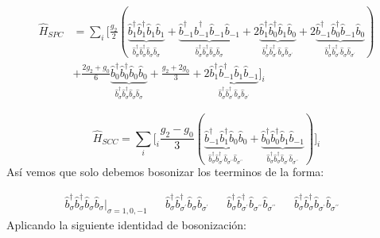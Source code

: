 \begin{align}
\hat{H}_{SPC} &= \sum_i \Bigg[ \frac{g_2}{2}\left(\underbrace{\hat{b}_{1}^{\dagger}\hat{b}_{1}^{\dagger} \hat{b}_{1}^{} \hat{b}_{1}^{} }_{\hat{b}_{\sigma}^{\dagger}\hat{b}_{\sigma}^{\dagger} \hat{b}_{\sigma}^{} \hat{b}_{\sigma}^{}}     +\underbrace{\hat{b}_{-1}^{\dagger}\hat{b}_{-1}^{\dagger} \hat{b}_{-1}^{} \hat{b}_{-1}^{} }_{\hat{b}_{\sigma}^{\dagger}\hat{b}_{\sigma}^{\dagger} \hat{b}_{\sigma}^{} \hat{b}_{\sigma}^{}} + 2\underbrace{\hat{b}_{1}^{\dagger}\hat{b}_{0}^{\dagger} \hat{b}_{1}^{} \hat{b}_{0}^{} }_{\hat{b}_{\sigma}^{\dagger}\hat{b}_{\sigma^\prime}^{\dagger} \hat{b}_{\sigma}^{} \hat{b}_{\sigma^\prime}^{}}+ 2\underbrace{\hat{b}_{-1}^{\dagger}\hat{b}_{0}^{\dagger} \hat{b}_{-1}^{} \hat{b}_{0}^{} }_{\hat{b}_{\sigma}^{\dagger}\hat{b}_{\sigma^\prime}^{\dagger} \hat{b}_{\sigma}^{} \hat{b}_{\sigma^\prime}^{}} \right) \nonumber \\
    & + \frac{2g_{2} + g_{0}}{6} 
    \underbrace{\hat{b}_{0}^{\dagger}\hat{b}_{0}^{\dagger} \hat{b}_{0}^{} \hat{b}_{0}^{} }_{\hat{b}_{\sigma}^{\dagger}\hat{b}_{\sigma}^{\dagger} \hat{b}_{\sigma}^{} \hat{b}_{\sigma}^{}}
    +\frac{g_{2} + 2g_{0}}{3} + 
    2\underbrace{\hat{b}_{1}^{\dagger}\hat{b}_{-1}^{\dagger} \hat{b}_{1}^{} \hat{b}_{-1}^{} }_{\hat{b}_{\sigma}^{\dagger}\hat{b}_{\sigma^\prime}^{\dagger} \hat{b}_{\sigma}^{} \hat{b}_{\sigma^\prime}^{}}
     \Bigg ]_i \nonumber
\end{align}


\begin{equation}
\hat{H}_{SCC}= \sum_i \Bigg [_i
\frac{g_{2}-g_{0}}{3} \left( 
\underbrace{\hat{b}_{-1}^{\dagger}\hat{b}_{1}^{\dagger} \hat{b}_{0}^{} \hat{b}_{0}^{} }_{\hat{b}_{\sigma}^{\dagger}\hat{b}_{\sigma^{\prime}}^{\dagger} \hat{b}_{\sigma^{ \prime \prime}}^{} \hat{b}_{\sigma^{\prime \prime}}^{}} + 
\underbrace{\hat{b}_{0}^{\dagger}\hat{b}_{0}^{\dagger} \hat{b}_{1}^{} \hat{b}_{-1}^{} }_{\hat{b}_{\sigma}^{\dagger}\hat{b}_{\sigma}^{\dagger} \hat{b}_{\sigma^{\prime}}^{} \hat{b}_{\sigma^{\prime \prime}}^{}}
\right) \Bigg ]_i
\end{equation}
Así vemos que solo debemos bosonizar los teerminos de la forma:

\begin{align}                       \hat{b}_{\sigma}^{\dagger}\hat{b}_{\sigma}^{\dagger} \hat{b}_{\sigma}^{} \hat{b}_{\sigma}^{} |_{\sigma = 1,0,-1}& &  \hat{b}_{\sigma}^{\dagger}\hat{b}_{\sigma^\prime}^{\dagger} \hat{b}_{\sigma}^{} \hat{b}_{\sigma^\prime}^{} & & \hat{b}_{\sigma}^{\dagger}\hat{b}_{\sigma^\prime}^{\dagger} \hat{b}_{\sigma^{\prime \prime}}^{} \hat{b}_{\sigma^{\prime \prime}}^{} &  & \hat{b}_{\sigma}^{\dagger}\hat{b}_{\sigma}^{\dagger} \hat{b}_{\sigma^\prime}^{} \hat{b}_{\sigma^{\prime \prime}}^{} &
\end{align}
Aplicando la siguiente identidad de bosonización:

